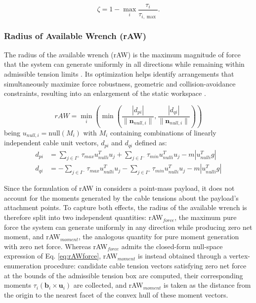 \begin{equation}
    \zeta = 1- \max_i \frac{\tau_i}{\tau_{i,\max}}.
\end{equation}


\subsubsection{Radius of Available Wrench (rAW)}
The radius of the available wrench (rAW) is the maximum magnitude of force that the system can generate uniformly in all directions while remaining within admissible tension limits \cite{jamshidifar_static_2020}. Its optimization helps identify arrangements that simultaneously maximize force robustness, geometric and collision-avoidance constraints, resulting into an enlargement of the static workspace \cite{jamshidifar_static_2020}.

\begin{equation}
    rAW = \min_i \left( \min \left(\frac{|d_{pi}|}{\|\mathbf{n}_{null, i} \|}, \frac{|d_{qi}|}{\|\mathbf{n}_{null, i} \|} \right)\right)
\label{eq:rAWforce}
\end{equation}
being $u_{null, i} = \text{null}(M_i)$ with $M_i$ containing combinations of linearly independent cable unit vectors, $d_{pi}$ and $d_{qi}$ defined as:
\begin{equation}
\begin{aligned}
        d_{pi} &= \sum_{j \in I^+} \tau_{max} u_{nulli}^T u_j + \sum_{j \in I^-} \tau_{min} u_{nulli}^T u_j - m |u_{nulli}^T g| \\
        d_{qi} &= -\sum_{j \in I^-} \tau_{max} u_{nulli}^T u_j - \sum_{j \in I^+} \tau_{min} u_{nulli}^T u_j - m |u_{nulli}^T g|
\end{aligned}
\end{equation}

Since the formulation of rAW in \cite{jamshidifar_static_2020} considers a point-mass payload, it does not account for the moments generated by the cable tensions about the payload's attachment points. To capture both effects, the radius of the available wrench is therefore split into two independent quantities: rAW$_{force}$, the maximum pure force the system can generate uniformly in any direction while producing zero net moment, and rAW$_{moment}$, the analogous quantity for pure moment generation with zero net force. Whereas rAW$_{force}$ admits the closed-form null-space expression of Eq. \eqref{eq:rAWforce}, rAW$_{moment}$ is instead obtained through a vertex-enumeration procedure: candidate cable tension vectors satisfying zero net force at the bounds of the admissible tension box are computed, their corresponding moments $\tau_i (\mathbf{b}_i \times \mathbf{u}_i)$ are collected, and rAW$_{moment}$ is taken as the distance from the origin to the nearest facet of the convex hull of these moment vectors.

